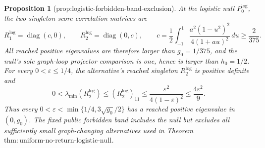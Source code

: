 \documentclass{article}
\newtheorem{proposition}{Proposition}
\begin{document}
\begin{proposition}[prop:logistic-forbidden-band-exclusion]\label{prop:logistic-forbidden-band-exclusion}
At the logistic null \(P_0^{\mathrm{log}}\), the two singleton score-correlation matrices are
\[
 R_1^{\mathrm{log}}=\operatorname{diag}(c,0),\qquad
 R_2^{\mathrm{log}}=\operatorname{diag}(0,c),
 \qquad
 c=\frac12\int_{-1}^1\frac{a^2(1-u^2)^2}{4(1+au)^2}\,du
 \ge\frac{2}{375}.
\]
All reached positive eigenvalues are therefore larger than \(g_0=1/375\), and the null's sole graph-loop projector comparison is one, hence is larger than \(h_0=1/2\).  For every \(0<\varepsilon\le1/4\), the alternative's reached singleton \(R_2^{\mathrm{log}}\) is positive definite and
\[
 0<\lambda_{\min}(R_2^{\mathrm{log}})
 \le (R_2^{\mathrm{log}})_{11}
 \le\frac{\varepsilon^2}{4(1-\varepsilon)^2}
 \le\frac{4\varepsilon^2}{9}.
\]
Thus every \(0<\varepsilon<\min\{1/4,3\sqrt{g_0}/2\}\) has a reached positive eigenvalue in \((0,g_0)\).  The fixed public forbidden band includes the null but excludes all sufficiently small graph-changing alternatives used in Theorem \(\mathrm{thm{:}uniform\mbox{-}no\mbox{-}return\mbox{-}logistic\mbox{-}null}\).
\end{proposition}
\end{document}
